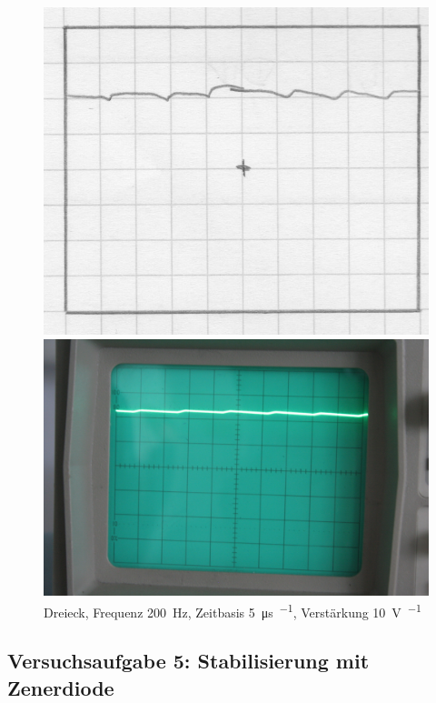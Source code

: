 \begin{figure}[htbp]
	\centering
	\begin{minipage}{.45\linewidth}
	\includegraphics[width=\linewidth]{Oszi_Hand/798.jpg}
	\end{minipage}
	\hfill
	\begin{minipage}{.45\linewidth}
	\includegraphics[width=\linewidth]{Oszi_Foto/798.jpg}
	\end{minipage}
	\caption{%
		Dreieck, Frequenz \SI{200}{\hertz},
		Zeitbasis \SI{5}{\micro\second\per\division},
		Verstärkung \SI{10}{\volt\per\division}
	}
	\label{fig:798}
\end{figure}

\FloatBarrier
\subsection{Versuchsaufgabe 5: Stabilisierung mit Zenerdiode}

